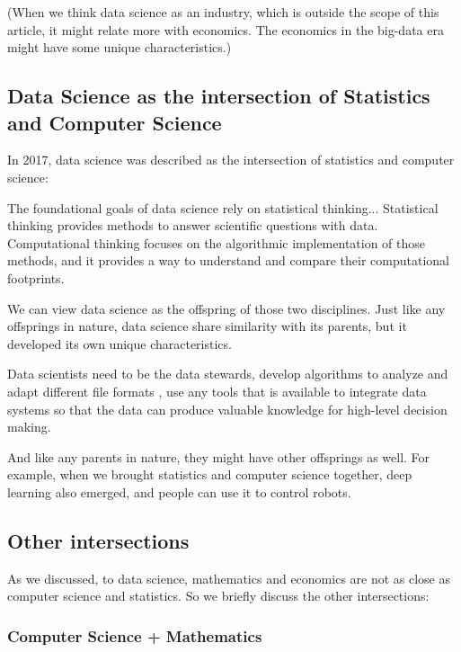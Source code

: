 (When we think data science as an industry, which is outside the scope of this article, it might relate more with economics. The economics in the big-data era might have some unique characteristics.)

\subsection*{Data Science as the intersection of Statistics and Computer Science}

In 2017, data science was described as the intersection of statistics and computer science:

\begin{displayquote}
The foundational goals of data science rely on statistical thinking...
Statistical thinking provides methods to answer scientific questions with data.
Computational thinking focuses on the algorithmic implementation of those methods, and it provides a way to understand and compare their computational footprints.
\cite{blei_science_2017}
\end{displayquote}

We can view data science as the offspring of those two disciplines.
Just like any offsprings in nature, data science share similarity with its parents, but it developed its own unique characteristics.

Data scientists need to be the data stewards, develop algorithms to analyze and adapt different file formats \cite{mattmann_vision_2013}, use any tools that is available to integrate data systems so that the data can produce valuable knowledge for high-level decision making.

And like any parents in nature, they might have other offsprings as well. 
For example, when we brought statistics and computer science together, deep learning also emerged, and people can use it to control robots.

\subsection*{Other intersections}

As we discussed, to data science, mathematics and economics are not as close as computer science and statistics.
So we briefly discuss the other intersections:

\subsubsection*{Computer Science + Mathematics}

